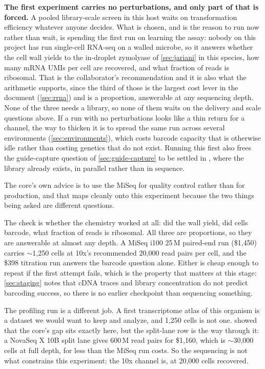 \begin{keybox}
\textbf{The first experiment carries no perturbations, and only part of that is
forced.} A pooled library-scale screen in this host waits on transformation
efficiency whatever anyone decides. What is chosen, and is the reason to run
now rather than wait, is spending the first run on learning the assay: nobody on
this project has run single-cell RNA-seq on a walled microbe, so it answers
whether the cell wall yields to the in-droplet zymolyase of \cref{sec:jariani} in
this species, how many mRNA UMIs per cell are recovered, and what fraction of
reads is ribosomal. That is the collaborator's recommendation and it is also what
the arithmetic supports, since the third of those is the largest cost lever in
the document (\cref{sec:rrna}) and is a proportion, answerable at any sequencing
depth. None of the three needs a library, so none of them waits on the delivery
and scale questions above. If a run with no perturbations looks like a thin
return for a channel, the way to thicken it is to spread the same run across
several environments (\cref{sec:environments}), which costs barcode capacity that
is otherwise idle rather than costing genetics that do not exist. Running this
first also frees the guide-capture question of \cref{sec:guide-capture} to be
settled in , where the library already exists, in parallel
rather than in sequence.
\end{keybox}

 The
core's own advice is to use the MiSeq for quality control rather than for
production, and that maps cleanly onto this experiment because the two things
being asked are different questions.

The check is whether the chemistry worked at all: did the wall yield, did cells
barcode, what fraction of reads is ribosomal. All three are proportions, so they
are answerable at almost any depth. A MiSeq i100 25\,M paired-end run
(\$1{,}450) carries $\sim$1{,}250 cells at 10x's recommended 20{,}000 read pairs
per cell, and the \$398 titration run answers the barcode question alone. Either
is cheap enough to repeat if the first attempt fails, which is the property that
matters at this stage: \cref{sec:staging} notes that cDNA traces and library
concentration do not predict barcoding success, so there is no earlier
checkpoint than sequencing something.

The profiling run is a different job. A first transcriptome atlas of this
organism is a dataset we would want to keep and analyze, and 1{,}250 cells is
not one.  showed that the core's gap sits exactly here, but
the split-lane row is the way through it: a NovaSeq X 10B split lane gives
600\,M read pairs for \$1{,}160, which is $\sim$30{,}000 cells at full depth,
for less than the MiSeq run costs. So the sequencing is not what constrains this
experiment; the 10x channel is, at 20{,}000 cells recovered.

